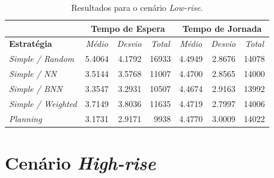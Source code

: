 \begin{table}[htb!]
\centering
\caption{Resultados para o cenário \textit{Low-rise}.}
\label{tab:results:lowrise}
\begin{tabular}{|l|r|r|r|r|r|r|}
\hline
\multicolumn{1}{|c|}{\textbf{}}                 & \multicolumn{3}{c|}{\textbf{Tempo de Espera}}                                                                    & \multicolumn{3}{c|}{\textbf{Tempo de Jornada}}                                                                                                                       \\ \hline
\textbf{Estratégia} & \multicolumn{1}{c|}{\textit{Médio}} & \multicolumn{1}{c|}{\textit{Desvio}} & \multicolumn{1}{c|}{\textit{Total}} & \multicolumn{1}{c|}{\textit{Médio}}                   & \multicolumn{1}{c|}{\textit{Desvio}}                  & \multicolumn{1}{c|}{\textit{Total}}                  \\ \hline
\textit{Simple / Random}          & 5.4064 & 4.1792 & 16933 & 4.4949 & 2.8676 & 14078 \\ \hline
\textit{Simple / NN}              & 3.5144 & 3.5768 & 11007 & 4.4700 & 2.8565 & 14000 \\ \hline
\textit{Simple / BNN}             & 3.3547 & 3.2931 & 10507 & \cellcolor[HTML]{67FD9A}4.4674 & 2.9163 & \cellcolor[HTML]{67FD9A}13992 \\ \hline
\textit{Simple / Weighted}        & 3.7149 & 3.8036 & 11635 & 4.4719 & \cellcolor[HTML]{67FD9A}2.7997 & 14006 \\ \hline
\textit{Planning}                 & \cellcolor[HTML]{67FD9A}3.1731 & \cellcolor[HTML]{67FD9A}2.9171 &  \cellcolor[HTML]{67FD9A}9938 & 4.4770 & 3.0009 & 14022 \\ \hline
\end{tabular}
\end{table}

\section{Cenário \textit{High-rise}}

\lipsum[1]

